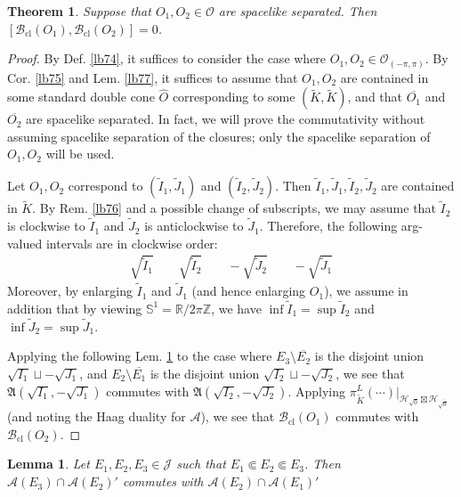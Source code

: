 \documentclass[11pt,b5paper,notitlepage]{article}
\theoremstyle{definition}
\theoremstyle{plain}
\newtheorem{thm}[df]{Theorem}
\newtheorem{lm}[df]{Lemma}
\newcommand{\fk}{\mathfrak}
\newcommand{\wtd}{\widetilde}
\newcommand{\wht}{\widehat}
\newcommand{\ovl}{\overline}
\newcommand{\Zbb}{\mathbb Z}
\newcommand{\Rbb}{\mathbb R}
\newcommand{\Sbb}{{\mathbb S}}
\newcommand{\MA}{\mathcal A}
\newcommand{\MH}{\mathcal H}
\newcommand{\MJ}{\mathcal J}
\newcommand{\MO}{\mathcal O}
\newcommand{\sqz}{{\sqrt 0}}
\newcommand{\Rpp}{\mathbb R^{1,1}_{(-\pi,\pi)}}
\newcommand{\Bcl}{\mathcal B_{\mathrm{cl}}}
\newcommand{\Opp}{\mathcal O_{(-\pi,\pi)}}
\numberwithin{equation}{section}
\begin{document}

\begin{thm}\label{lb78}
Suppose that $O_1,O_2\in\MO$ are spacelike separated. Then $[\Bcl(O_1),\Bcl(O_2)]=0$.
\end{thm}


\begin{proof}
By Def. \ref{lb74}, it suffices to consider the case where $O_1,O_2\in\Opp$. By Cor. \ref{lb75} and Lem. \ref{lb77}, it suffices to assume that $O_1,O_2$ are contained in some standard double cone $\wht O$ corresponding to some $(\wtd K,\wtd K)$, and that $\ovl{O_1}$ and $\ovl{O_2}$ are spacelike separated. In fact, we will prove the commutativity without assuming spacelike separation of the closures; only the spacelike separation of $O_1,O_2$ will be used.


Let $O_1,O_2$ correspond to $(\wtd I_1,\wtd J_1)$ and $(\wtd I_2,\wtd J_2)$. Then $\wtd I_1,\wtd J_1,\wtd I_2,\wtd J_2$ are contained in $\wtd K$. By Rem. \ref{lb76} and a possible change of subscripts, we may assume that $\wtd I_2$ is clockwise to $\wtd I_1$ and $\wtd J_2$ is anticlockwise to $\wtd J_1$. Therefore, the following arg-valued intervals are in clockwise order:
\begin{align*}
\sqrt{\wtd I_1}\qquad\sqrt{\wtd I_2}\qquad -\sqrt{\wtd J_2}\qquad -\sqrt{\wtd J_1}
\end{align*}
Moreover, by enlarging $\wtd I_1$ and $\wtd J_1$ (and hence enlarging $O_1$), we assume in addition that by viewing $\Sbb^1=\Rbb/2\pi\Zbb$, we have $\inf\wtd I_1=\sup\wtd I_2$ and $\inf\wtd J_2=\sup\wtd J_1$. 

Applying the following Lem. \ref{lb73} to the case where $E_3\setminus \ovl{E_2}$ is the disjoint union $\sqrt{I_1}\sqcup -\sqrt{J_1}$, and $E_2\setminus \ovl{E_1}$ is the disjoint union $\sqrt{I_2}\sqcup -\sqrt{J_2}$, we see that $\fk A(\sqrt{I_1},-\sqrt{J_1})$ commutes with $\fk A(\sqrt{I_2},-\sqrt{J_2})$. Applying $\pi^L_{\wtd K}(\cdots)|_{\MH_\sqz\boxtimes\MH_{\ovl\sqz}}$ (and noting the Haag duality for $\MA$), we see that $\Bcl(O_1)$ commutes with $\Bcl(O_2)$.
\end{proof}


\begin{lm}\label{lb73}
Let $E_1,E_2,E_3\in\MJ$ such that $E_1\Subset E_2\Subset E_3$. Then $\MA(E_3)\cap\MA(E_2)'$ commutes with $\MA(E_2)\cap\MA(E_1)'$
\end{lm}
\end{document}
